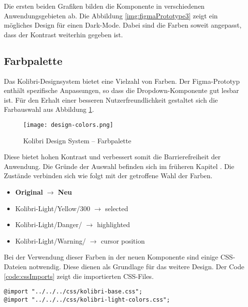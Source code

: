 Die ersten beiden Grafiken bilden die Komponente in verschiedenen Anwendungsgebieten ab. 
Die Abbildung \ref{img:figmaPrototype3} zeigt ein mögliches Design für einen Dark-Mode. 
Dabei sind die Farben soweit angepasst, dass der Kontrast weiterhin gegeben ist. 


\subsection{Farbpalette}
\label{sec:colorContrast}

Das Kolibri-Designsystem bietet eine Vielzahl von Farben. 
Der Figma-Prototyp enthält spezifische Anpassungen, so dass die Dropdown-Komponente gut lesbar ist. 
Für den Erhalt einer besseren Nutzerfreundlichkeit gestaltet sich die Farbauswahl aus Abbildung \ref{img:designColors}. 

\begin{figure}[!htb]
    \centering
    \texttt{[image: design-colors.png]}
    \caption{\centering Kolibri Design System – Farbpalette}
    \label{img:designColors}
\end{figure}

Diese bietet hohen Kontrast und verbessert somit die Barrierefreiheit der Anwendung. 
Die Gründe der Auswahl befinden sich im früheren Kapitel \textbf{}. 
Die Zustände verbinden sich wie folgt mit der getroffene Wahl der Farben. 

\begin{itemize}
    \item \textbf{Original} $\rightarrow$ \textbf{Neu}
    \item Kolibri-Light/Yellow/300 $\rightarrow$ selected
    \item Kolibri-Light/Danger/ $\rightarrow$ highlighted
    \item Kolibri-Light/Warning/ $\rightarrow$ cursor position
\end{itemize}

Bei der Verwendung dieser Farben in der neuen Komponente sind einige CSS-Dateien notwendig. 
Diese dienen als Grundlage für das weitere Design. 
Der Code \ref{code:cssImports} zeigt die importierten CSS-Files. 

\begin{lstlisting}[style = htmlcssjs, caption = Notwendige CSS Imports, label = code:cssImports]
@import "../../../css/kolibri-base.css";
@import "../../../css/kolibri-light-colors.css";
\end{lstlisting}


